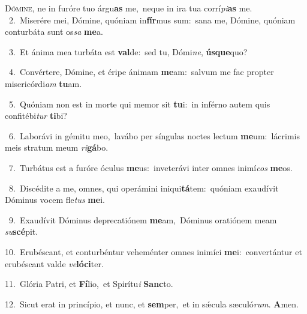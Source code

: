 \lettrine{\initial\textcolor{\initialcolor}{D}}{ómine,} ne in furóre tuo árgu\textbf{as} me,~\star neque in ira tua corrí\-\textit{pi}\-\textbf{as} me.\\
{\numbfont\textcolor{\numbcolor}{~2.}}~Miserére mei, Dómine, quóniam in\-\textbf{fír}\-mus sum:~\star sana me, Dómine, quóniam conturbáta sunt os\textit{sa} \textbf{me}\-a.\par
{\numbfont\textcolor{\numbcolor}{~3.}}~Et ánima mea turbáta est \textbf{val}\-de:~\star sed tu, Dómi\-\textit{ne}\-, \textbf{ús}\-\textbf{que}quo?\par
{\numbfont\textcolor{\numbcolor}{~4.}}~Convértere, Dómine, et éripe ánimam \textbf{me}\-am:~\star salvum me fac propter misericórdi\textit{am} \textbf{tu}\-am.\par
{\numbfont\textcolor{\numbcolor}{~5.}}~Quóniam non est in morte qui memor sit \textbf{tu}\-i:~\star in inférno autem quis confitébi\textit{tur} \textbf{ti}\-bi?\par
{\numbfont\textcolor{\numbcolor}{~6.}}~Laborávi in gémitu meo,~\dagger lavábo per síngulas noctes lectum \textbf{me}\-um:~\star lácrimis meis stratum meum \textit{ri}\-\textbf{gá}bo.\par
{\numbfont\textcolor{\numbcolor}{~7.}}~Turbátus est a furóre óculus \textbf{me}\-us:~\star inveterávi inter omnes inimí\textit{cos} \textbf{me}\-os.\par
{\numbfont\textcolor{\numbcolor}{~8.}}~Discédite a me, omnes, qui operámini iniqui\-\textbf{tá}\-tem:~\star quóniam exaudívit Dóminus vocem fle\textit{tus} \textbf{me}\-i.\par
{\numbfont\textcolor{\numbcolor}{~9.}}~Exaudívit Dóminus deprecatiónem \textbf{me}\-am,~\star Dóminus oratiónem meam \textit{su}\-\textbf{scé}pit.\par
{\numbfont\textcolor{\numbcolor}{10.}}~Erubéscant, et conturbéntur veheménter omnes inimíci \textbf{me}\-i:~\star convertántur et erubéscant valde \textit{ve}\-\textbf{ló}\textbf{ci}ter.\par
{\numbfont\textcolor{\numbcolor}{11.}}~Glória Patri, et \textbf{Fí}\-lio,~\star et Spirítu\textit{i} \textbf{Sanc}\-to.\par
{\numbfont\textcolor{\numbcolor}{12.}}~Sicut erat in princípio, et nunc, et \textbf{sem}\-per,~\star et in sǽcula sæculó\-\textit{rum}\-. \textbf{A}\-men.\par
